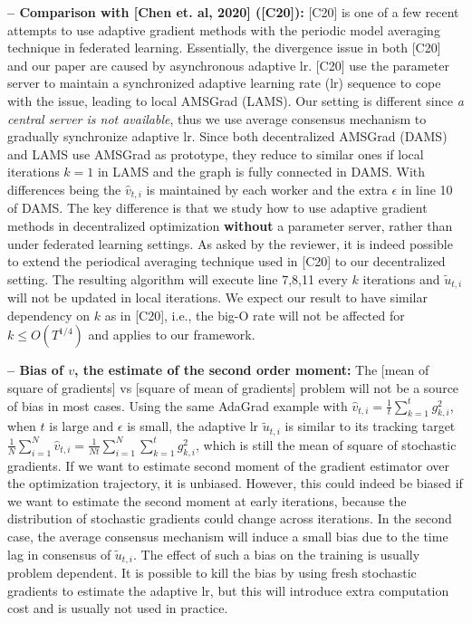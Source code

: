 \documentclass{article} %
\begin{document}
\textbf{-- Comparison with [Chen et. al, 2020] ([C20]):} 
[C20] is one of a few recent attempts to use adaptive gradient methods with the periodic model averaging technique in federated learning. 
Essentially, the divergence issue in both [C20] and our paper are caused by asynchronous adaptive lr. 
[C20] use the parameter server to maintain a synchronized adaptive learning rate (lr) sequence to cope with the issue, leading to local AMSGrad (LAMS). 
Our setting is different since \emph{a central server is not available}, thus we use average consensus mechanism to gradually synchronize adaptive lr. 
Since both decentralized AMSGrad (DAMS) and LAMS use AMSGrad as prototype, they reduce to similar ones if local iterations $k=1$ in LAMS and the graph is fully connected in DAMS. 
With differences being the $\hat v_{t,i}$ is maintained by each worker and the extra $\epsilon$ in line 10 of DAMS. 
The key difference is that we study how to use adaptive gradient methods in decentralized optimization \textbf{without} a parameter server, rather than under federated learning settings. 
As asked by the reviewer, it is indeed possible to extend the periodical averaging technique used in [C20] to our decentralized setting. 
The resulting algorithm will execute line 7,8,11 every $k$ iterations and $\tilde {u}_{t,i}$ will not be updated in local iterations. 
We expect our result to have similar dependency on $k$ as in [C20], i.e., the big-O rate will not be affected for $k \leq O(T^{1/4})$ and applies to our framework. 

 \vspace{-2pt}
\textbf{-- Bias of $v$, the estimate of the second order moment:} The [mean of square of gradients] vs [square of mean of gradients] problem will not be a source of bias in most cases. 
Using the same AdaGrad example with $\hat v_{t,i} = \frac{1}{t}\sum_{k=1}^t g_{k,i}^2$, when $t$ is large and $\epsilon$ is small, the adaptive lr $\tilde{u}_{t,i}$ is similar to its tracking target $\frac{1}{N} \sum_{i=1}^N\hat v_{t,i} = \frac{1}{Nt} \sum_{i=1}^N\sum_{k=1}^t g_{k,i}^2$, which is still the mean of square of stochastic gradients. 
If we want to estimate second moment of the gradient estimator over the optimization trajectory, it is unbiased. 
However, this could indeed be biased if we want to estimate the second moment at early iterations, because the distribution of stochastic gradients could change across iterations. 
In the second case, the average consensus mechanism will induce a small bias due to the time lag in consensus of $\tilde{u}_{t,i}$. 
The effect of such a bias on the training is usually problem dependent. 
It is possible to kill the bias by using fresh stochastic gradients to estimate the adaptive lr, but this will introduce extra computation cost and is usually not used in practice.
\end{document}
